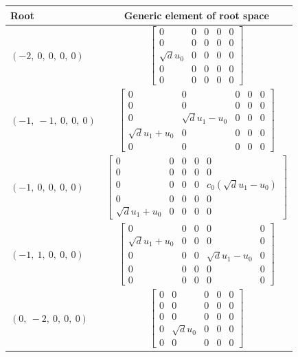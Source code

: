 \documentclass[11pt]{article}
\theoremstyle{definition}
\begin{document}
\bigskip

\noindent \begin{longtable}{|l|c|}
    \hline
    \textbf{Root} & \textbf{Generic element of root space} \\
    \hline
    \endhead
    $\left( -2, \  0, \  0, \  0, \  0\right)$ & ${\left[\begin{matrix}0 & 0 & 0 & 0 & 0\\0 & 0 & 0 & 0 & 0\\\sqrt{d} u_{0} & 0 & 0 & 0 & 0\\0 & 0 & 0 & 0 & 0\\0 & 0 & 0 & 0 & 0\end{matrix}\right]}$ \\
    \hline
    $\left( -1, \  -1, \  0, \  0, \  0\right)$ & ${\left[\begin{matrix}0 & 0 & 0 & 0 & 0\\0 & 0 & 0 & 0 & 0\\0 & \sqrt{d} u_{1} - u_{0} & 0 & 0 & 0\\\sqrt{d} u_{1} + u_{0} & 0 & 0 & 0 & 0\\0 & 0 & 0 & 0 & 0\end{matrix}\right]}$ \\
    \hline
    $\left( -1, \  0, \  0, \  0, \  0\right)$ & ${\left[\begin{matrix}0 & 0 & 0 & 0 & 0\\0 & 0 & 0 & 0 & 0\\0 & 0 & 0 & 0 & c_{0} \left(\sqrt{d} u_{1} - u_{0}\right)\\0 & 0 & 0 & 0 & 0\\\sqrt{d} u_{1} + u_{0} & 0 & 0 & 0 & 0\end{matrix}\right]}$ \\
    \hline
    $\left( -1, \  1, \  0, \  0, \  0\right)$ & ${\left[\begin{matrix}0 & 0 & 0 & 0 & 0\\\sqrt{d} u_{1} + u_{0} & 0 & 0 & 0 & 0\\0 & 0 & 0 & \sqrt{d} u_{1} - u_{0} & 0\\0 & 0 & 0 & 0 & 0\\0 & 0 & 0 & 0 & 0\end{matrix}\right]}$ \\
    \hline
    $\left( 0, \  -2, \  0, \  0, \  0\right)$ & ${\left[\begin{matrix}0 & 0 & 0 & 0 & 0\\0 & 0 & 0 & 0 & 0\\0 & 0 & 0 & 0 & 0\\0 & \sqrt{d} u_{0} & 0 & 0 & 0\\0 & 0 & 0 & 0 & 0\end{matrix}\right]}$ \\

\end{longtable}
\end{document}
